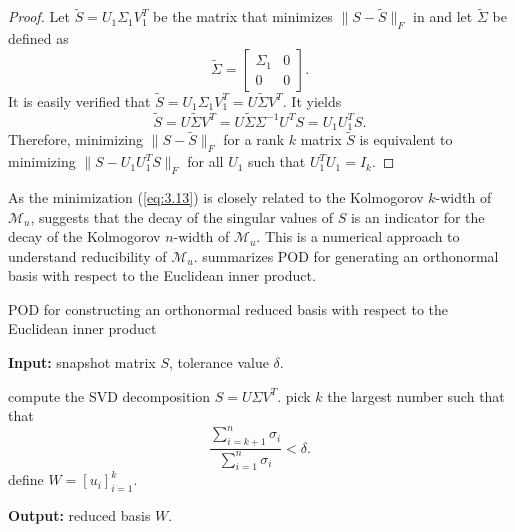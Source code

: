 \begin{proof}
Let $\tilde S = U_1 \Sigma_1 V_1^T$ be the matrix that minimizes $\| S - \tilde S \|_F$ in  and let $\tilde \Sigma$ be defined as
\begin{equation} \label{eq:3.17}
	\tilde \Sigma =
	\begin{bmatrix}
		\Sigma_1 & 0 \\
		0 & 0
	\end{bmatrix}.	
\end{equation}
It is easily verified that $\tilde S = U_1 \Sigma_1 V_1^T = U \tilde \Sigma V^T$. It yields
\begin{equation} \label{eq:3.18}
	\tilde S =  U \tilde \Sigma V^T = U \tilde \Sigma \Sigma^{-1} U^T S = U_1 U_1^T S.
\end{equation}
Therefore, minimizing $\| S - \tilde S \|_F$ for a rank $k$ matrix $\tilde S$ is equivalent to minimizing $\| S - U_1U_1^T S \|_F$ for all $U_1$ such that $U_1^T U_1 = I_k$.
\end{proof}
As the minimization (\ref{eq:3.13}) is closely related to the Kolmogorov $k$-width of $\mathcal M_u$,  suggests that the decay of the singular values of $S$ is an indicator for the decay of the Kolmogorov $n$-width of $\mathcal M_u$. This is a numerical approach to understand reducibility of $\mathcal M_u$.  summarizes POD for generating an orthonormal basis with respect to the Euclidean inner product.

\begin{algorithm} 
	\caption{POD for constructing an orthonormal reduced basis with respect to the Euclidean inner product} \label{alg:3.1}
	\textbf{Input:} snapshot matrix $S$, tolerance value $\delta$.
	\begin{algorithmic} [1]
		\State compute the SVD decomposition $S = U \Sigma V^T$.
		\State pick $k$ the largest number such that that
		\[
			\frac{\sum_{i=k+1}^n \sigma_i}{\sum_{i=1}^n \sigma_i} < \delta.
		\]
		\State define $W = [u_i]_{i=1}^k$.
	\end{algorithmic}
	\vspace{0.5cm}
	\textbf{Output:} reduced basis $W$.
\end{algorithm}

